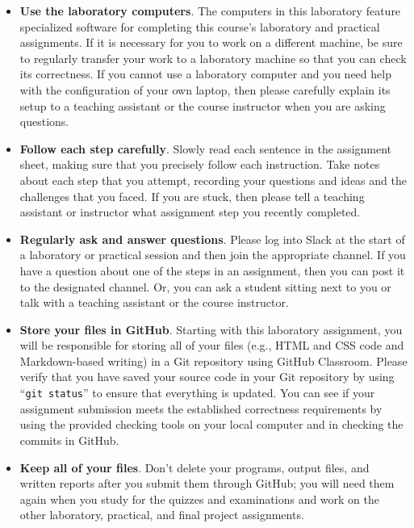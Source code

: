 \documentclass[11pt]{article}
\newcommand{\command}[1]{``\lstinline{#1}''}
\begin{document}
\begin{itemize}
  \setlength{\itemsep}{0pt}

\item {\bf Use the laboratory computers}. The computers in this laboratory
  feature specialized software for completing this course's laboratory and
  practical assignments. If it is necessary for you to work on a different
  machine, be sure to regularly transfer your work to a laboratory machine so
  that you can check its correctness. If you cannot use a laboratory computer
  and you need help with the configuration of your own laptop, then please
  carefully explain its setup to a teaching assistant or the course instructor
  when you are asking questions.

\item {\bf Follow each step carefully}. Slowly read each sentence in the
  assignment sheet, making sure that you precisely follow each instruction. Take
  notes about each step that you attempt, recording your questions and ideas and
  the challenges that you faced. If you are stuck, then please tell a teaching
  assistant or instructor what assignment step you recently completed.

\item {\bf Regularly ask and answer questions}. Please log into Slack at the
  start of a laboratory or practical session and then join the appropriate
  channel. If you have a question about one of the steps in an assignment, then
  you can post it to the designated channel. Or, you can ask a student sitting
  next to you or talk with a teaching assistant or the course instructor.

\item {\bf Store your files in GitHub}. Starting with this laboratory
  assignment, you will be responsible for storing all of your files (e.g., HTML
  and CSS code and Markdown-based writing) in a Git repository using GitHub
  Classroom. Please verify that you have saved your source code in your Git
  repository by using \command{git status} to ensure that everything is updated.
  You can see if your assignment submission meets the established correctness
  requirements by using the provided checking tools on your local computer and
  in checking the commits in GitHub.

\item {\bf Keep all of your files}. Don't delete your programs, output files,
  and written reports after you submit them through GitHub; you will need them
  again when you study for the quizzes and examinations and work on the other
  laboratory, practical, and final project assignments.


\end{itemize}
\end{document}
